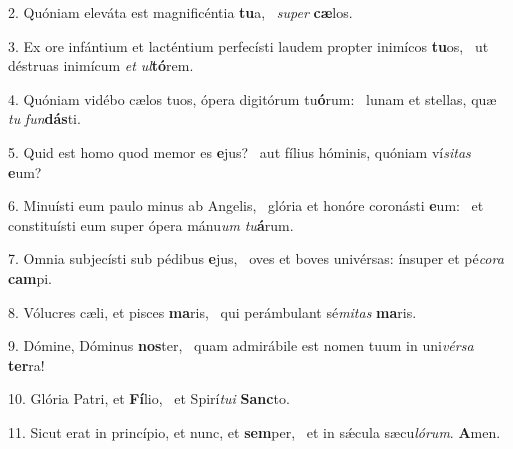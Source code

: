 2. Quóniam eleváta est magnificéntia \textbf{tu}a, \ast\  \textit{su}\textit{per} \textbf{cæ}los.\

3. Ex ore infántium et lacténtium perfecísti laudem propter inimícos \textbf{tu}os, \ast\  ut déstruas inimícum \textit{et} \textit{ul}\textbf{tó}rem.\

4. Quóniam vidébo cælos tuos, ópera digitórum tu\textbf{ó}rum: \ast\  lunam et stellas, quæ \textit{tu} \textit{fun}\textbf{dás}ti.\

5. Quid est homo quod memor es \textbf{e}jus? \ast\  aut fílius hóminis, quóniam ví\textit{si}\textit{tas} \textbf{e}um?\

6. Minuísti eum paulo minus ab Angelis, \dag\  glória et honóre coronásti \textbf{e}um: \ast\  et constituísti eum super ópera mánu\textit{um} \textit{tu}\textbf{á}rum.\

7. Omnia subjecísti sub pédibus \textbf{e}jus, \ast\  oves et boves univérsas: ínsuper et pé\textit{co}\textit{ra} \textbf{cam}pi.\

8. Vólucres cæli, et pisces \textbf{ma}ris, \ast\  qui perámbulant sé\textit{mi}\textit{tas} \textbf{ma}ris.\

9. Dómine, Dóminus \textbf{nos}ter, \ast\  quam admirábile est nomen tuum in uni\textit{vér}\textit{sa} \textbf{ter}ra!\

10. Glória Patri, et \textbf{Fí}lio, \ast\  et Spirí\textit{tu}\textit{i} \textbf{Sanc}to.\

11. Sicut erat in princípio, et nunc, et \textbf{sem}per, \ast\  et in sǽcula sæcu\textit{ló}\textit{rum}. \textbf{A}men.\

